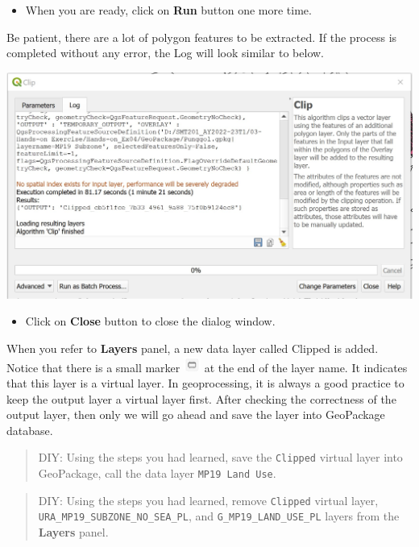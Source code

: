 \documentclass[
  letterpaper,
  DIV=11,
  numbers=noendperiod]{scrreprt}
\providecommand{\tightlist}{%
  \setlength{\itemsep}{0pt}\setlength{\parskip}{0pt}}\usepackage{longtable,booktabs,array}
\begin{document}
\begin{itemize}
\tightlist
\item
  When you are ready, click on \textbf{Run} button one more time.
\end{itemize}

Be patient, there are a lot of polygon features to be extracted. If the
process is completed without any error, the Log will look similar to
below.

\includegraphics{./img04/image28.jpg}

\begin{itemize}
\tightlist
\item
  Click on \textbf{Close} button to close the dialog window.
\end{itemize}

When you refer to \textbf{Layers} panel, a new data layer called Clipped
is added. Notice that there is a small marker
\includegraphics[width=0.21875in,height=\textheight]{./img04/image30.jpg}
at the end of the layer name. It indicates that this layer is a virtual
layer. In geoprocessing, it is always a good practice to keep the output
layer a virtual layer first. After checking the correctness of the
output layer, then only we will go ahead and save the layer into
GeoPackage database.

\begin{quote}
DIY: Using the steps you had learned, save the \texttt{Clipped} virtual
layer into GeoPackage, call the data layer \texttt{MP19\ Land\ Use}.
\end{quote}

\begin{quote}
DIY: Using the steps you had learned, remove \texttt{Clipped} virtual
layer, \texttt{URA\_MP19\_SUBZONE\_NO\_SEA\_PL}, and
\texttt{G\_MP19\_LAND\_USE\_PL} layers from the \textbf{Layers} panel.
\end{quote}
\end{document}
